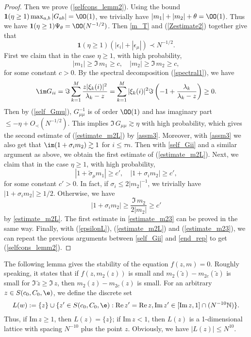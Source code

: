 \begin{proof}
Then we prove (\ref{selfcons_lemm2}). Using the bound $\mathbf{1}(\eta\ge 1)\max_{a,b}|G_{ab}|=\OO(1)$, we trivially have $|m_1|+ |m_2| + \theta=\OO(1)$. Thus we have 
$\mathbf 1(\eta\ge 1) \Psi_\theta =\OO(N^{-1/2})$. Then \eqref{m_T} and (\ref{Zestimate2}) together give that
\begin{equation}\label{epsilonL}
\mathbf 1(\eta\ge 1) (|\epsilon_i|+|\epsilon_\mu|) \prec N^{-1/2}.
\end{equation}
First we claim that in the case $\eta \ge 1$, with high probability,
\begin{equation}\label{estimate_m2L}
|m_1| \ge \Im\, m_1 \ge c , \quad |m_2| \ge \Im\, m_2 \ge c , 
\end{equation} 
for some constant $c>0$. By the spectral decomposition (\ref{spectral1}), we have
$$\im G_{ii} = \Im \sum_{k = 1}^{M} \frac{z|\xi_k(i)|^2}{\lambda_k-z}= \sum_{k = 1}^{M} |\xi_k(i)|^2 \Im \left( -1 + \frac{\lambda_k}{\lambda_k-z}\right)\ge 0.$$
Then by (\ref{self_Gmu}), $G_{\mu\mu}^{-1}$ is of order $\OO(1)$ and has imaginary part $\le - \eta + O_\prec\left( N^{-1/2}\right)$. This implies $ \Im\, G_{\mu\mu} \gtrsim \eta$ with high probability, which gives the second estimate of (\ref{estimate_m2L}) by \eqref{assm3}. Moreover, with \eqref{assm3} we also get that $\im ( 1 + \sigma_i m_2)\gtrsim 1$ for $i \le \tau n.$ 
Then with \eqref{self_Gii} and a similar argument as above, we obtain the first estimate of (\ref{estimate_m2L}). Next, we claim that in the case $\eta\ge 1$, with high probability,
\begin{equation}\label{estimate_m23}
| 1+ \tilde \sigma_\mu m_1| \ge c', \quad | 1+ \sigma_i m_2| \ge c' , 
\end{equation} 
for some constant $c'>0$. In fact, if $\sigma_i \le 2|m_2|^{-1}$, we trivially have $| 1+ \sigma_i m_2|\ge 1/2$. Otherwise, we have 
$$|1+ \sigma_i m_2| \ge \frac{ \Im\, m_2}{2|m_2|} \ge c'$$
by \eqref{estimate_m2L}. The first estimate in \eqref{estimate_m23} can be proved in the same way. Finally, with (\ref{epsilonL}), (\ref{estimate_m2L}) and (\ref{estimate_m23}), we can repeat the previous arguments between \eqref{self_Gii} and \eqref{end_rep} to get (\ref{selfcons_lemm2}).
\end{proof}

The following lemma gives the stability of the equation $ f(z,m)=0$. Roughly speaking, it states that if $f(z, m_{2}(z))$ is small and $m_2(\tilde z)-m_{2c}(\tilde z)$ is small for $\Im\, \tilde z \ge \Im\, z$, then $m_{2}(z)-m_{2c}(z)$ is small. For an arbitrary $z\in S(c_0,C_0, \e)$, we define the discrete set
\begin{align*}%
L(w):=\{z\}\cup \{z'\in S(c_0,C_0, \e): \text{Re}\, z' = \text{Re}\, z, \text{Im}\, z'\in [\text{Im}\, z, 1]\cap (N^{-10}\mathbb N)\} .
\end{align*}
Thus, if $\text{Im}\, z \ge 1$, then $L(z)=\{z\}$; if $\text{Im}\, z<1$, then $L(z)$ is a 1-dimensional lattice with spacing $N^{-10}$ plus the point $z$. Obviously, we have $|L(z)|\le N^{10}$. %

